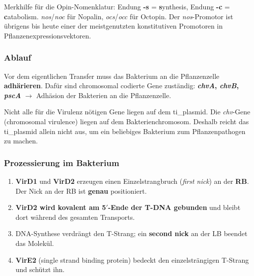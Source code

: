 \begin{bem}
    Merkhilfe für die Opin-Nomenklatur: Endung \textbf{-s} = \textbf{s}ynthesis,
    Endung \textbf{-c} = \textbf{c}atabolism. \emph{nos}/\emph{noc} für Nopalin,
    \emph{ocs}/\emph{occ} für Octopin.
    Der \emph{nos}-Promotor ist übrigens bis
    heute einer der meistgenutzten konstitutiven Promotoren in
    Pflanzenexpressionsvektoren.
\end{bem}
\subsubsection{Ablauf}

Vor dem eigentlichen Transfer muss das Bakterium an die Pflanzenzelle
\textbf{adhärieren}.
Dafür sind chromosomal codierte Gene zuständig:
\textbf{\emph{chvA}, \emph{chvB}, \emph{pscA}} $\rightarrow$ Adhäsion der
Bakterien an die Pflanzenzelle.

\begin{bem}
    Nicht alle für die Virulenz nötigen Gene liegen
    auf dem \gls{ti_plasmid}.
    Die \emph{chv}-Gene (chromosomal virulence) liegen auf dem
    Bakterienchromosom.
    Deshalb reicht das \gls{ti_plasmid} allein nicht aus, um ein
    beliebiges Bakterium zum Pflanzenpathogen zu machen.
\end{bem}

\subsubsection*{Prozessierung im Bakterium}
\begin{enumerate}
    \item \textbf{VirD1} und \textbf{VirD2} erzeugen einen Einzelstrangbruch
    (\emph{first nick}) an der \textbf{RB}.
    Der Nick an der RB ist
    \textbf{genau} positioniert.
    \item \textbf{VirD2 wird kovalent am 5$'$-Ende der T-DNA gebunden} und bleibt
    dort während des gesamten Transports.
    \item DNA-Synthese verdrängt den T-Strang; ein \textbf{second nick} an der LB
    beendet das Molekül.
    \item \textbf{VirE2} (single strand binding protein) bedeckt den
    einzelsträngigen T-Strang und schützt ihn.
\end{enumerate}

